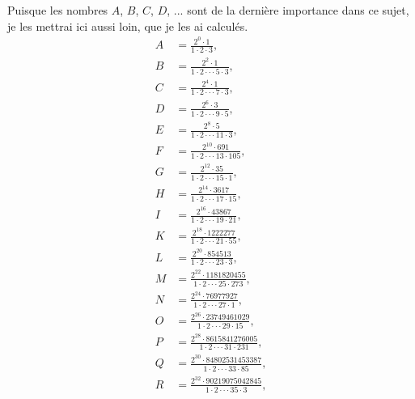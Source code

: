 \documentclass[12pt]{article}
\theoremstyle{definition}
\begin{document}
Puisque les nombres $A$, $B$, $C$, $D$, $...$ sont de la dernière importance dans ce sujet, je les mettrai ici aussi loin, que je les ai calculés.
\begin{align*}
    A &= \frac{2^0 \cdot 1}{1 \cdot 2 \cdot 3}, \\
    B &= \frac{2^2 \cdot 1}{1 \cdot 2 \cdot \cdot \cdot 5 \cdot 3}, \\
    C &= \frac{2^4 \cdot 1}{1 \cdot 2 \cdot \cdot \cdot 7 \cdot 3}, \\
    D &= \frac{2^6 \cdot 3}{1 \cdot 2 \cdot \cdot \cdot 9 \cdot 5}, \\
    E &= \frac{2^8 \cdot 5}{1 \cdot 2 \cdot \cdot \cdot 11 \cdot 3}, \\
    F &= \frac{2^{10} \cdot 691}{1 \cdot 2 \cdot \cdot \cdot 13 \cdot 105}, \\
    G &= \frac{2^{12} \cdot 35}{1 \cdot 2 \cdot \cdot \cdot 15 \cdot 1}, \\
    H &= \frac{2^{14} \cdot 3617}{1 \cdot 2 \cdot \cdot \cdot 17 \cdot 15}, \\
    I &= \frac{2^{16} \cdot 43867}{1 \cdot 2 \cdot \cdot \cdot 19 \cdot 21}, \\
    K &= \frac{2^{18} \cdot 1222277}{1 \cdot 2 \cdot \cdot \cdot 21 \cdot 55}, \\
    L &= \frac{2^{20} \cdot 854513}{1 \cdot 2 \cdot \cdot \cdot 23 \cdot 3}, \\
    M &= \frac{2^{22} \cdot 1181820455}{1 \cdot 2 \cdot \cdot \cdot 25 \cdot 273}, \\
    N &= \frac{2^{24} \cdot 76977927}{1 \cdot 2 \cdot \cdot \cdot 27 \cdot 1}, \\
    O &= \frac{2^{26} \cdot 23749461029}{1 \cdot 2 \cdot \cdot \cdot 29 \cdot 15}, \\
    P &= \frac{2^{28} \cdot 8615841276005}{1 \cdot 2 \cdot \cdot \cdot 31 \cdot 231}, \\
    Q &= \frac{2^{30} \cdot 84802531453387}{1 \cdot 2 \cdot \cdot \cdot 33 \cdot 85}, \\
    R &= \frac{2^{32} \cdot 90219075042845}{1 \cdot 2 \cdot \cdot \cdot 35 \cdot 3}, 
\end{align*} 
\end{document}
